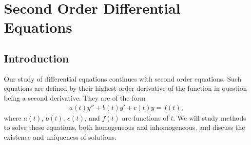 \chapter{Second Order Differential Equations}
\setcounter{exercisecounter}{0}

\setcounter{thmcounter}{1}
\section{Introduction}
\noindent Our study of differential equations continues with second order equations.
Such equations are defined by their highest order derivative of the function in question being a second derivative.
They are of the form
\begin{align*}
    a(t)y'' + b(t)y' + c(t)y = f(t),
\end{align*}
where $a(t)$, $b(t)$, $c(t)$, and $f(t)$ are functions of $t$.
We will study methods to solve these equations, both homogeneous and inhomogeneous, and discuss the existence and uniqueness of solutions.
